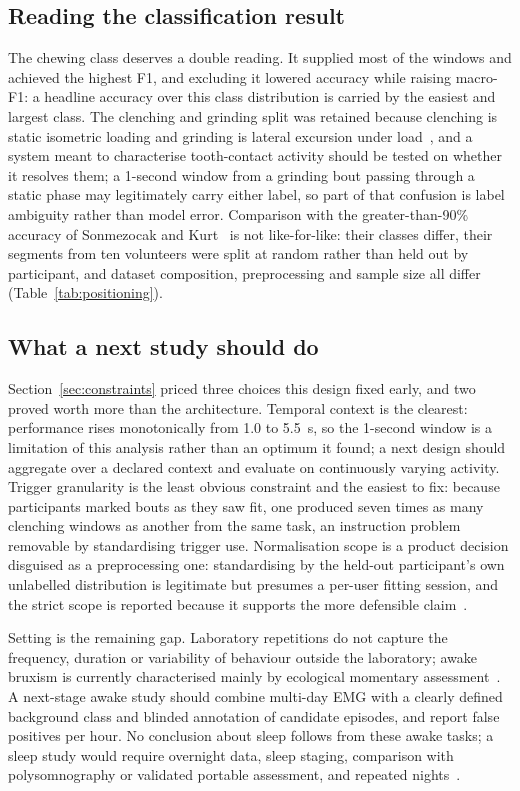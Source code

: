 \documentclass[pdflatex,sn-nature,iicol]{sn-jnl}
\begin{document}
\subsection{Reading the classification result}

The chewing class deserves a double reading. It supplied most of the windows and achieved the highest F1, and excluding it lowered accuracy while raising macro-F1: a headline accuracy over this class distribution is carried by the easiest and largest class. The clenching and grinding split was retained because clenching is static isometric loading and grinding is lateral excursion under load~\cite{lan2022comparative}, and a system meant to characterise tooth-contact activity should be tested on whether it resolves them; a 1-second window from a grinding bout passing through a static phase may legitimately carry either label, so part of that confusion is label ambiguity rather than model error. Comparison with the greater-than-90\% accuracy of Sonmezocak and Kurt~\cite{sonmezocak2021detection} is not like-for-like: their classes differ, their segments from ten volunteers were split at random rather than held out by participant, and dataset composition, preprocessing and sample size all differ (Table~\ref{tab:positioning}).

\subsection{What a next study should do}

Section~\ref{sec:constraints} priced three choices this design fixed early, and two proved worth more than the architecture. Temporal context is the clearest: performance rises monotonically from 1.0 to 5.5~s, so the 1-second window is a limitation of this analysis rather than an optimum it found; a next design should aggregate over a declared context and evaluate on continuously varying activity. Trigger granularity is the least obvious constraint and the easiest to fix: because participants marked bouts as they saw fit, one produced seven times as many clenching windows as another from the same task, an instruction problem removable by standardising trigger use. Normalisation scope is a product decision disguised as a preprocessing one: standardising by the held-out participant's own unlabelled distribution is legitimate but presumes a per-user fitting session, and the strict scope is reported because it supports the more defensible claim~\cite{besomi2020consensus}.

Setting is the remaining gap. Laboratory repetitions do not capture the frequency, duration or variability of behaviour outside the laboratory; awake bruxism is currently characterised mainly by ecological momentary assessment~\cite{bracci2018frequency}. A next-stage awake study should combine multi-day EMG with a clearly defined background class and blinded annotation of candidate episodes, and report false positives per hour. No conclusion about sleep follows from these awake tasks; a sleep study would require overnight data, sleep staging, comparison with polysomnography or validated portable assessment, and repeated nights~\cite{lavigne1996sleep,casett2017validity,cidverdejo2024instrumental}.
\end{document}
